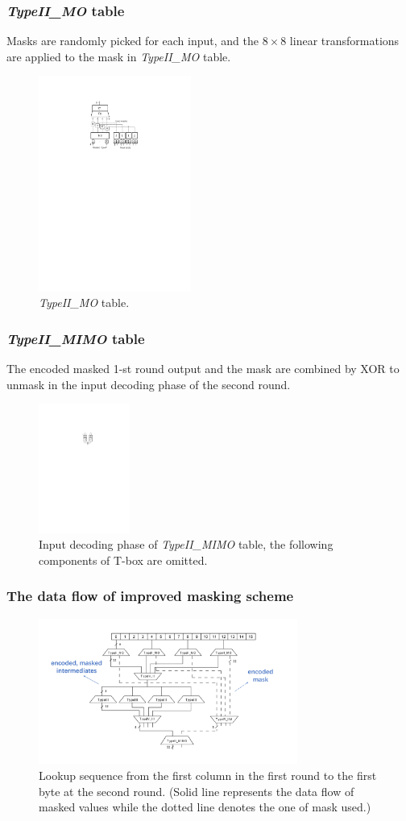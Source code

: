 \documentclass{beamer}
\begin{document}
\frame
{
	\frametitle{\textit{TypeII\_MO} table}
	Masks are randomly picked for each input, and the $8\times 8$ linear transformations are applied to the mask in \textit{TypeII\_MO} table.
	\begin{figure}
		\centering
		\includegraphics[width=5cm]{./pics/IIMO.pdf}
		\caption{\textit{TypeII\_MO} table.}
	\end{figure}
}

\frame
{
	\frametitle{\textit{TypeII\_MIMO} table}
	The encoded masked 1-st round output and the mask are combined by XOR to unmask in the input decoding phase of the second round.
	\begin{figure}
		\centering
		\includegraphics[width=3.0cm]{./pics/IIMIMO.pdf}
		\caption{Input decoding phase of \textit{TypeII\_MIMO} table, the following components of T-box are omitted.}
	\end{figure}
}

\frame
{
	\frametitle{The data flow of improved masking scheme}
	\begin{figure}
		\centering
		\includegraphics[width=8.5cm]{./pics/DCA_R12_1.pdf}
		\caption{Lookup sequence from the first column in the first round to the first byte at the second round. (Solid line represents the data flow of masked values while the dotted line denotes the one of mask used.)}
	\end{figure}
}
\end{document}
